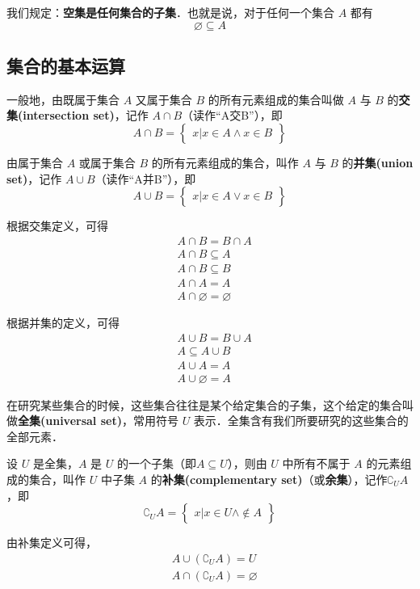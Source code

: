 我们规定：\textbf{空集是任何集合的子集}．也就是说，对于任何一个集合 $A$ 都有
\begin{equation}
\varnothing \subseteq A
\end{equation}

\subsection{集合的基本运算}
一般地，由既属于集合 $A$ 又属于集合 $B$ 的所有元素组成的集合叫做 $A$ 与 $B$ 的\textbf{交集(intersection set)}，记作 $A \cap B$（读作“A交B”），即
\begin{equation}
A\cap B = \begin{Bmatrix} x|x\in A \wedge x\in B \end{Bmatrix}
\end{equation}

由属于集合 $A$ 或属于集合 $B$ 的所有元素组成的集合，叫作 $A$ 与 $B$ 的\textbf{并集(union set)}，记作 $A\cup B$（读作“A并B”），即
\begin{equation}
A\cup B = \begin{Bmatrix}x|x\in A \vee x\in B\end{Bmatrix}
\end{equation}

根据交集定义，可得
\begin{equation}
\begin{aligned}
&A\cap B = B\cap A \\ 
&A\cap B \subseteq A \\
&A\cap B \subseteq B \\
&A\cap A = A \\
&A\cap \varnothing = \varnothing
\end{aligned}
\end{equation}

根据并集的定义，可得
\begin{equation}
\begin{aligned}
&A\cup B = B\cup A \\
&A\subseteq A\cup B \\
&A\cup A = A \\
&A\cup \varnothing = A
\end{aligned}
\end{equation}

在研究某些集合的时候，这些集合往往是某个给定集合的子集，这个给定的集合叫做\textbf{全集(universal set)}，常用符号 $U$ 表示．全集含有我们所要研究的这些集合的全部元素．

设 $U$ 是全集，$A$ 是 $U$ 的一个子集（即$A\subseteq U$），则由 $U$ 中所有不属于 $A$ 的元素组成的集合，叫作 $U$ 中子集 $A$ 的\textbf{补集(complementary set)}（或\textbf{余集}），记作$\complement_UA$，即
\begin{equation}
\complement_UA = \begin{Bmatrix}x|x\in U \wedge \notin A\end{Bmatrix}
\end{equation}

由补集定义可得，
\begin{equation}
\begin{aligned}
&A\cup (\complement_UA) = U \\
&A\cap (\complement_UA) = \varnothing
\end{aligned}
\end{equation}